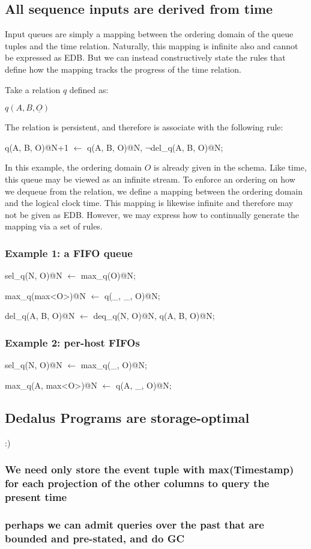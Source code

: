 \subsection{All sequence inputs are derived from time}

Input queues are simply a mapping between the ordering domain of the queue tuples and the time relation.  Naturally, this mapping
is infinite also and cannot be expressed as EDB.  But we can instead constructively state the rules that define how the mapping 
tracks the progress of the time relation.

Take a relation $q$ defined as:

$q(A, B, \underline{O})$

The relation is persistent, and therefore is associate with the following rule:

\begin{Dedalus}
q(A, B, O)@N+1 \(\leftarrow\)
  q(A, B, O)@N, 
  \(\lnot\)del\_q(A, B, O)@N;
\end{Dedalus}

In this example, the ordering domain $O$ is already given in the schema.  Like time, this queue may be viewed as an infinite stream.
To enforce an ordering on how we dequeue from the relation, we define a mapping between the ordering domain and the logical clock
time.  This mapping is likewise infinite and therefore may not be given as EDB.  However, we may express how to continually generate 
the mapping via a set of rules.

\subsubsection{Example 1: a FIFO queue}

\begin{Dedalus}
sel\_q(N, O)@N \(\leftarrow\)
  max\_q(O)@N;

max\_q(max<O>)@N \(\leftarrow\)
  q(\_, \_, O)@N;

del\_q(A, B, O)@N \(\leftarrow\)
  deq\_q(N, O)@N,
  q(A, B, O)@N;
\end{Dedalus}

\subsubsection{Example 2: per-host FIFOs}

\begin{Dedalus}
sel\_q(N, O)@N \(\leftarrow\)
  max\_q(_, O)@N; 

max\_q(A, max<O>)@N \(\leftarrow\)
q(A, \_, O)@N;
\end{Dedalus}


\subsection{Dedalus Programs are storage-optimal}

:)

\subsubsection{We need only store the event tuple with max(Timestamp) for each projection of the other columns to query the present time}


\subsubsection{perhaps we can admit queries over the past that are bounded and pre-stated, and do GC}
